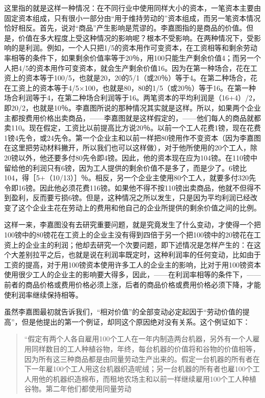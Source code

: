 这里指的就是这样一种情况：在不同行业中使用同样大小的资本，一笔资本主要由固定资本组成，只有很小一部分由“用于维持劳动的”资本组成，而另一笔资本情况恰好相反。首先，说对“商品”产生影响是荒谬的。李嘉图指的是商品的价值。但是，价值在多大程度上受这种情况的影响呢？根本不受影响。在两种情况下，受影响的是利润。例如，一个人只把1/5的资本用作可变资本，在工资相等和剩余劳动率相等的条件下，如果剩余价值率等于20％，用100只能生产剩余价值4；而另一个人把4/5的资本用作可变资本，就会生产剩余价值16。因为在第一种场合，花在工资上的资本等于100/5，也就是20，20的5/1（或20％）等于4。在第二种场合，花在工资上的资本等于4/5×100，也就是80，80的1/5（或20％）等于16。在第一种场合利润等于4，在第二种场合利润等于16。两笔资本的平均利润是（16+4）/2，即20/2，也就是10％。李嘉图所说的那种情况其实就是这样。所以，如果两个企业主都按费用价格出卖商品，——李嘉图就是这样假定的，——他们每人的商品就都卖110。现在假定，工资比以前提高比方说20％。以前一个工人花费1镑，现在花费1镑4先令，或24先令。第一个企业主和以前一样把80镑用作不变资本（因为李嘉图在这里把劳动材料撇开，所以我们也可以这样做），对于他所使用的20个工人，除20镑以外，他还要多付80先令即4镑。因此，他的资本现在应为104镑。在110镑中留给他的利润只有6镑，因为工人提供的剩余价值不是多了，而是少了。6镑比104，得［5+（10/13）］％。相反，另一个企业主使用80个工人，就要多付320先令即16镑。因此他必须花费116镑。如果他不得不按110镑出卖商品，他就不但得不到盈利，反而要亏损6镑。但是，这种情况之所以发生，只是因为平均利润已经改变了这个企业主花在劳动上的费用和他自己的企业所提供的剩余价值之间的比例。

这样一来，李嘉图没有去研究重要问题，就是究竟发生了什么变动，才使得一个把100镑中的80镑花在工资上的企业主没有得到四倍于另一个把100镑中的20镑花在工资上的企业主的利润；他却去研究一个次要问题，即下述情况是怎样产生的：在这个大差别拉平之后，也就是说在利润率既定时，这种利润率的任何变动，比如由于工资的提高，对于用100镑资本使用许多工人的企业主的影响，比对于用100镑资本使用很少工人的企业主的影响要大得多，因此，——在利润率相等的条件下，——前者的商品价格或费用价格必须上涨，后者的商品价格或费用价格必须下降，才能使利润率继续保持相等。

虽然李嘉图最初就告诉我们，“相对价值”的全部变动必定起因于“劳动价值的提高”，但是他提出的第一个例证，却同这个原因绝对没有关系。这个例证如下：

\begin{quote}{“假定有两个人各自雇用100个工人在一年内制造两台机器，另外有一个人雇用同样数目的工人种植谷物，年终，每台机器的价值将和谷物的价值相等，因为所有这三种商品都是由同量劳动生产出来的。假定一台机器的所有者在下一年雇100个工人用这台机器织造呢绒；另一台机器的所有者也雇100个工人用他的机器织造棉布，而租地农场主和以前一样继续雇用100个工人种植谷物。第二年他们都使用同量劳动}\end{quote}

